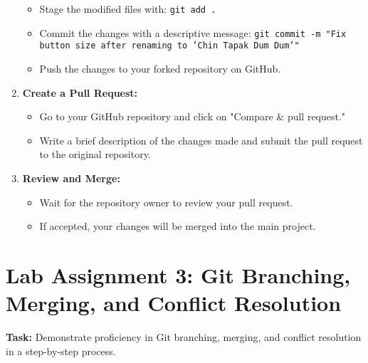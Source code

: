 \documentclass[a4paper,12pt]{article}
\begin{document}
\begin{enumerate}[label=\arabic*.]
    \begin{itemize}
        \item Stage the modified files with: \texttt{git add .}
        \item Commit the changes with a descriptive message: \texttt{git commit -m "Fix button size after renaming to 'Chin Tapak Dum Dum'"}
        \item Push the changes to your forked repository on GitHub.
    \end{itemize}
    \item \textbf{Create a Pull Request:}
    \begin{itemize}
        \item Go to your GitHub repository and click on "Compare & pull request."
        \item Write a brief description of the changes made and submit the pull request to the original repository.
    \end{itemize}
    \item \textbf{Review and Merge:}
    \begin{itemize}
        \item Wait for the repository owner to review your pull request.
        \item If accepted, your changes will be merged into the main project.
    \end{itemize}
\end{enumerate}
\section{Lab Assignment 3: Git Branching, Merging, and Conflict Resolution}

\textbf{Task:} Demonstrate proficiency in Git branching, merging, and conflict resolution in a step-by-step process.
\end{document}
